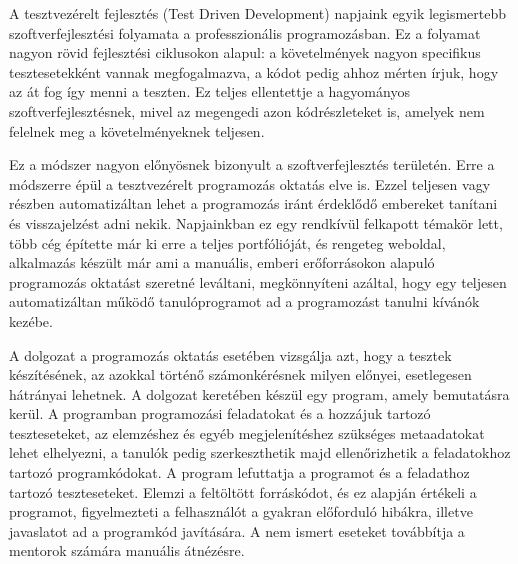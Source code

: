 


A tesztvezérelt fejlesztés (Test Driven Development) napjaink egyik legismertebb szoftverfejlesztési folyamata a professzionális programozásban. Ez a folyamat nagyon rövid fejlesztési ciklusokon alapul: a követelmények nagyon specifikus tesztesetekként vannak megfogalmazva, a kódot pedig ahhoz mérten írjuk, hogy az át fog így menni a teszten. Ez teljes ellentettje a hagyományos szoftverfejlesztésnek, mivel az megengedi azon kódrészleteket is, amelyek nem felelnek meg a követelményeknek teljesen.

Ez a módszer nagyon előnyösnek bizonyult a szoftverfejlesztés területén. Erre a módszerre épül a tesztvezérelt programozás oktatás elve is. Ezzel teljesen vagy részben automatizáltan lehet a programozás iránt érdeklődő embereket tanítani és visszajelzést adni nekik. Napjainkban ez egy rendkívül felkapott témakör lett, több cég építette már ki erre a teljes portfólióját, és rengeteg weboldal, alkalmazás készült már ami a manuális, emberi erőforrásokon alapuló programozás oktatást szeretné leváltani, megkönnyíteni azáltal, hogy egy teljesen automatizáltan működő tanulóprogramot ad a programozást tanulni kívánók kezébe.

A dolgozat a programozás oktatás esetében vizsgálja azt, hogy a tesztek készítésének, az azokkal történő számonkérésnek milyen előnyei, esetlegesen hátrányai lehetnek. A dolgozat keretében készül egy program, amely bemutatásra kerül. A programban programozási feladatokat és a hozzájuk tartozó teszteseteket, az elemzéshez és egyéb megjelenítéshez szükséges metaadatokat lehet elhelyezni, a tanulók pedig szerkeszthetik majd ellenőrizhetik a feladatokhoz tartozó programkódokat. A program lefuttatja a programot és a feladathoz tartozó teszteseteket. Elemzi a feltöltött forráskódot, és ez alapján értékeli a programot, figyelmezteti a felhasználót a gyakran előforduló hibákra, illetve javaslatot ad a programkód javítására. A nem ismert eseteket továbbítja a mentorok számára manuális átnézésre.
